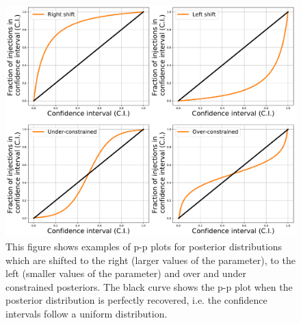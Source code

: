 \begin{figure}[ht]
    \centering
    \includegraphics[width=\linewidth]{C5_parameter/ppplot_examples.pdf}
    \caption[p-p plot examples]{This figure shows examples of p-p plots for
posterior distributions which are shifted to the right (larger values of the
parameter), to the left (smaller values of the parameter) and over and under
constrained posteriors. The black curve shows the p-p plot when the posterior
distribution is perfectly recovered, i.e. the confidence intervals follow a
uniform distribution.~}
\label{par_est:results:ppplot_example}
\end{figure}

